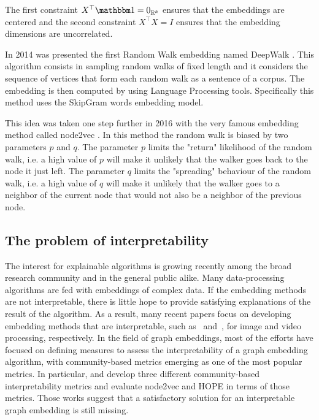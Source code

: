 The first constraint $X^\top \ones = \zeros{\realset^k}$ ensures that the embeddings are centered and the second constraint $X^\top X = I$ ensures that the embedding dimensions are uncorrelated.

In 2014 was presented the first Random Walk embedding named DeepWalk \cite{perozzi2014_DeepWalkOnlineLearning}. This algorithm consists in sampling random walks of fixed length and it considers the sequence of vertices that form each random walk as a sentence of a corpus. The embedding is then computed by using Language Processing tools. Specifically this method uses the SkipGram words embedding model.

This idea was taken one step further in 2016 with the very famous embedding method called node2vec \cite{groverNode2vecScalableFeature2016}. In this method the random walk is biased by two parameters $p$ and $q$. The parameter $p$ limits the "return" likelihood of the random walk, i.e. a high value of $p$ will make it unlikely that the walker goes back to the node it just left. The parameter $q$ limits the "spreading" behaviour of the random walk, i.e. a high value of $q$ will make it unlikely that the walker goes to a neighbor of the current node that would not also be a neighbor of the previous node.



\subsection{The problem of interpretability}\label{subsec:interpretability_explained}
The interest for explainable algorithms is growing recently among the broad research community and in the general public alike. Many data-processing algorithms are fed with embeddings of complex data. If the embedding methods are not interpretable, there is little hope to provide satisfying explanations of the result of the algorithm. As a result, many recent papers focus on developing embedding methods that are interpretable, such as~\cite{example_interpr_lee_2021} and~\cite{example_interpr_wu_2020}, for image and video processing, respectively.
In the field of graph embeddings, most of the efforts have focused on defining measures to assess the interpretability of a graph embedding algorithm, with community-based metrics emerging as one of the most popular metrics. In particular, \cite{khoshraftar2021} and \cite{gogoglou_2019} develop three different community-based interpretability metrics and evaluate node2vec and HOPE in terms of those metrics. Those works suggest that a satisfactory solution for an interpretable graph embedding is still missing. %

